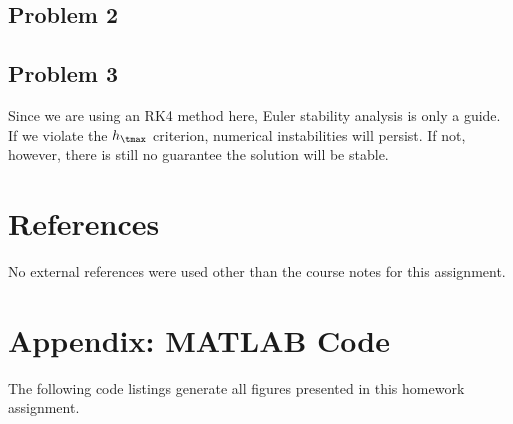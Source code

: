 \documentclass[12pt]{article}
\begin{document}
\subsection{Problem 2}

\subsection{Problem 3}

Since we are using an RK4 method here, Euler stability analysis is only a guide. If we violate the $h_\tmax$ criterion, numerical instabilities will persist. If not, however, there is still no guarantee the solution will be stable.

\section{References} %

No external references were used other than the course notes for this assignment.


\section*{Appendix: MATLAB Code} %

The following code listings generate all figures presented in this homework assignment.




\end{document}
